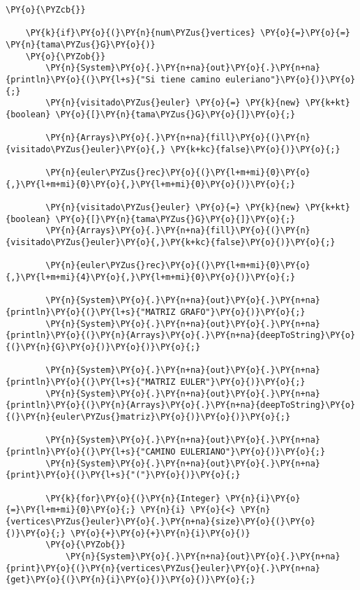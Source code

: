 \begin{Verbatim}[commandchars=\\\{\}]
	\PY{o}{\PYZcb{}}

    \PY{k}{if}\PY{o}{(}\PY{n}{num\PYZus{}vertices} \PY{o}{=}\PY{o}{=} \PY{n}{tama\PYZus{}G}\PY{o}{)}
	\PY{o}{\PYZob{}}
	    \PY{n}{System}\PY{o}{.}\PY{n+na}{out}\PY{o}{.}\PY{n+na}{println}\PY{o}{(}\PY{l+s}{"Si tiene camino euleriano"}\PY{o}{)}\PY{o}{;}
	    \PY{n}{visitado\PYZus{}euler} \PY{o}{=} \PY{k}{new} \PY{k+kt}{boolean} \PY{o}{[}\PY{n}{tama\PYZus{}G}\PY{o}{]}\PY{o}{;}
		
	    \PY{n}{Arrays}\PY{o}{.}\PY{n+na}{fill}\PY{o}{(}\PY{n}{visitado\PYZus{}euler}\PY{o}{,} \PY{k+kc}{false}\PY{o}{)}\PY{o}{;}

	    \PY{n}{euler\PYZus{}rec}\PY{o}{(}\PY{l+m+mi}{0}\PY{o}{,}\PY{l+m+mi}{0}\PY{o}{,}\PY{l+m+mi}{0}\PY{o}{)}\PY{o}{;}
				
	    \PY{n}{visitado\PYZus{}euler} \PY{o}{=} \PY{k}{new} \PY{k+kt}{boolean} \PY{o}{[}\PY{n}{tama\PYZus{}G}\PY{o}{]}\PY{o}{;}
	    \PY{n}{Arrays}\PY{o}{.}\PY{n+na}{fill}\PY{o}{(}\PY{n}{visitado\PYZus{}euler}\PY{o}{,}\PY{k+kc}{false}\PY{o}{)}\PY{o}{;}

	    \PY{n}{euler\PYZus{}rec}\PY{o}{(}\PY{l+m+mi}{0}\PY{o}{,}\PY{l+m+mi}{4}\PY{o}{,}\PY{l+m+mi}{0}\PY{o}{)}\PY{o}{;}

	    \PY{n}{System}\PY{o}{.}\PY{n+na}{out}\PY{o}{.}\PY{n+na}{println}\PY{o}{(}\PY{l+s}{"MATRIZ GRAFO"}\PY{o}{)}\PY{o}{;}
	    \PY{n}{System}\PY{o}{.}\PY{n+na}{out}\PY{o}{.}\PY{n+na}{println}\PY{o}{(}\PY{n}{Arrays}\PY{o}{.}\PY{n+na}{deepToString}\PY{o}{(}\PY{n}{G}\PY{o}{)}\PY{o}{)}\PY{o}{;}
			
	    \PY{n}{System}\PY{o}{.}\PY{n+na}{out}\PY{o}{.}\PY{n+na}{println}\PY{o}{(}\PY{l+s}{"MATRIZ EULER"}\PY{o}{)}\PY{o}{;}
	    \PY{n}{System}\PY{o}{.}\PY{n+na}{out}\PY{o}{.}\PY{n+na}{println}\PY{o}{(}\PY{n}{Arrays}\PY{o}{.}\PY{n+na}{deepToString}\PY{o}{(}\PY{n}{euler\PYZus{}matriz}\PY{o}{)}\PY{o}{)}\PY{o}{;}

	    \PY{n}{System}\PY{o}{.}\PY{n+na}{out}\PY{o}{.}\PY{n+na}{println}\PY{o}{(}\PY{l+s}{"CAMINO EULERIANO"}\PY{o}{)}\PY{o}{;}
	    \PY{n}{System}\PY{o}{.}\PY{n+na}{out}\PY{o}{.}\PY{n+na}{print}\PY{o}{(}\PY{l+s}{"("}\PY{o}{)}\PY{o}{;}
			
	    \PY{k}{for}\PY{o}{(}\PY{n}{Integer} \PY{n}{i}\PY{o}{=}\PY{l+m+mi}{0}\PY{o}{;} \PY{n}{i} \PY{o}{<} \PY{n}{vertices\PYZus{}euler}\PY{o}{.}\PY{n+na}{size}\PY{o}{(}\PY{o}{)}\PY{o}{;} \PY{o}{+}\PY{o}{+}\PY{n}{i}\PY{o}{)}
		\PY{o}{\PYZob{}}
		    \PY{n}{System}\PY{o}{.}\PY{n+na}{out}\PY{o}{.}\PY{n+na}{print}\PY{o}{(}\PY{n}{vertices\PYZus{}euler}\PY{o}{.}\PY{n+na}{get}\PY{o}{(}\PY{n}{i}\PY{o}{)}\PY{o}{)}\PY{o}{;}
				

\end{Verbatim}
